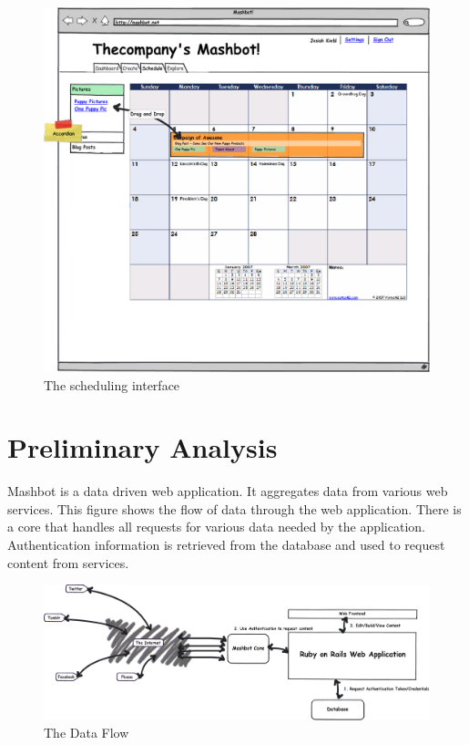 \documentclass{report}
\begin{document}
\clearpage
\begin{figure}
\centering
\includegraphics[scale=0.35]{../mockups/schedule.png}
\caption{The scheduling interface}
\label{schedule}
\end{figure}
\clearpage
\section{Preliminary Analysis} %
Mashbot is a data driven web application.  It aggregates data from
various web services.  This figure shows the flow of data through the
web application.  There is a core that handles all requests for
various data needed by the application.  Authentication information is
retrieved from the database and used to request content from services.

\begin{figure}
\centering
\includegraphics[scale=0.3]{../mockups/dataflow.png}
\caption{The Data Flow}
\end{figure}
\begin{figure}
\label{dataflow}
\end{figure}
\end{document}
